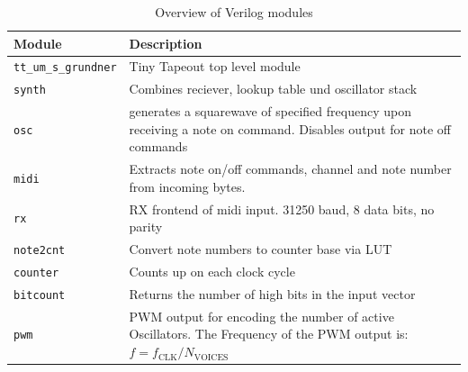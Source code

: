 \begin{table}[h!]
	\caption{Overview of Verilog modules}\label{tab:verilog-modules}
	\begin{tabularx}{\textwidth}{
			p{}
			p{}
		}
		\toprule
		Module                       & Description                                                                                                                            \\ \midrule
		\lstinline!tt_um_s_grundner! & Tiny Tapeout top level module                                                                                                          \\
		\lstinline!synth!            & Combines reciever, lookup table und oscillator stack                                                                                   \\
		\lstinline!osc!              & generates a squarewave of specified frequency upon receiving a note on command. Disables output for note off commands                  \\
		\lstinline!midi!             & Extracts note on/off commands, channel and note number from incoming bytes.                                                            \\
		\lstinline!rx!               & RX frontend of midi input. 31250 baud, 8 data bits, no parity                                                                          \\
		\lstinline!note2cnt!         & Convert note numbers to counter base via LUT                                                                                           \\
		\lstinline!counter!          & Counts up on each clock cycle                                                                                                          \\
		\lstinline!bitcount!         & Returns the number of high bits in the input vector                                                                                    \\
		\lstinline!pwm!              & PWM output for encoding the number of active Oscillators. The Frequency of the PWM output is: $f = f_{\text{CLK}} / N_{\text{VOICES}}$ \\
		\bottomrule
	\end{tabularx}
\end{table}